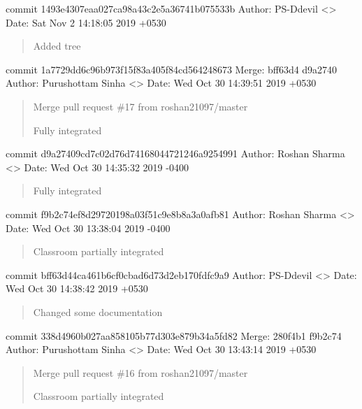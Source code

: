 \documentclass[letterpaper,10pt,english]{sphinxmanual}
\begin{document}
commit 1493e4307eaa027ca98a43c2e5a36741b075533b
Author: PS-Ddevil \textless{}\textgreater{}
Date:   Sat Nov 2 14:18:05 2019 +0530
\begin{quote}

Added tree
\end{quote}

commit 1a7729dd6c96b973f15f83a405f84cd564248673
Merge: bff63d4 d9a2740
Author: Purushottam Sinha \textless{}\textgreater{}
Date:   Wed Oct 30 14:39:51 2019 +0530
\begin{quote}

Merge pull request \#17 from roshan21097/master

Fully  integrated
\end{quote}

commit d9a27409cd7c02d76d74168044721246a9254991
Author: Roshan Sharma \textless{}\textgreater{}
Date:   Wed Oct 30 14:35:32 2019 -0400
\begin{quote}

Fully  integrated
\end{quote}

commit f9b2c74ef8d29720198a03f51c9e8b8a3a0afb81
Author: Roshan Sharma \textless{}\textgreater{}
Date:   Wed Oct 30 13:38:04 2019 -0400
\begin{quote}

Classroom partially integrated
\end{quote}

commit bff63d44ca461b6cf0cbad6d73d2eb170fdfc9a9
Author: PS-Ddevil \textless{}\textgreater{}
Date:   Wed Oct 30 14:38:42 2019 +0530
\begin{quote}

Changed some documentation
\end{quote}

commit 338d4960b027aa858105b77d303e879b34a5fd82
Merge: 280f4b1 f9b2c74
Author: Purushottam Sinha \textless{}\textgreater{}
Date:   Wed Oct 30 13:43:14 2019 +0530
\begin{quote}

Merge pull request \#16 from roshan21097/master

Classroom partially integrated
\end{quote}
\end{document}
